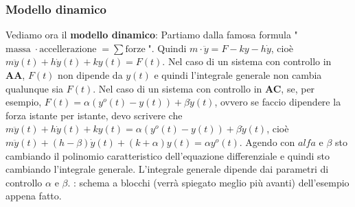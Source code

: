 \subsubsection*{Modello dinamico}
Vediamo ora il \textbf{modello dinamico}:
Partiamo dalla famosa formula "$\text{massa}\; \cdot \text{accellerazione}\; = \sum \text{forze}\;$".\newline
Quindi $m \cdot \ddot{y} = F - ky - h \dot{y}$, cioè $m \ddot{y}(t) + h \dot{y}(t) + k y(t) = F(t)$.\newline
\newline
Nel caso di un sistema con controllo in \textbf{AA}, $F(t)$ non dipende da $y(t)$ e quindi l'integrale generale non cambia qualunque sia $F(t)$.\newline
\newline
Nel caso di un sistema con controllo in \textbf{AC}, se, per esempio, $F(t) = \alpha(y^o(t) -y(t)) + \beta \dot{y}(t)$, ovvero se faccio dipendere la forza istante per istante, devo scrivere che $m \ddot{y}(t) + h \dot{y}(t) + k y(t) = \alpha(y^o(t) - y(t) ) + \beta \dot{y}(t)$, cioè $m \ddot{y}(t) + (h - \beta) \dot{y}(t) + (k + \alpha)y(t) = \alpha y^o(t)$. Agendo con $alfa$ e $\beta$ sto cambiando il polinomio caratteristico dell'equazione differenziale e quindi sto cambiando l'integrale generale. L'integrale generale dipende dai parametri di controllo $\alpha$ e $\beta$.\newline
{}: schema a blocchi (verrà spiegato meglio più avanti) dell'esempio appena fatto.